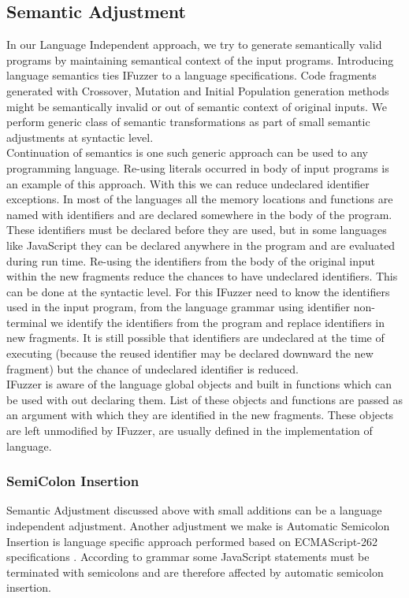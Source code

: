 \documentclass{acm_proc_article-sp}
\begin{document}
\subsection{Semantic Adjustment} \label{semantics}
In our Language Independent approach, we try to generate semantically valid programs by maintaining semantical context of the input programs. Introducing language semantics ties IFuzzer to a language specifications. Code fragments generated with Crossover, Mutation and Initial Population generation   methods might be semantically invalid or out of semantic context of original inputs. We perform generic class of semantic transformations as part of small semantic adjustments at syntactic level. \\
\indent Continuation of semantics is one such generic approach can be used to any programming language. Re-using literals occurred in body of input programs is an example of this approach. With this we can reduce undeclared identifier exceptions. In most of the languages all the memory locations and functions are named with identifiers and are declared somewhere in the body of the program. These identifiers must be declared before they are used, but in some languages like JavaScript they can be declared anywhere in the program and are evaluated during run time. Re-using the identifiers from the body of the original input within the new fragments reduce the chances to have undeclared identifiers. This can be done at the syntactic level. For this IFuzzer need to know the identifiers used in the input program, from the language grammar using identifier non-terminal we identify the identifiers from the program and replace identifiers in new fragments. It is still possible that identifiers are undeclared at the time of executing (because the reused identifier may be declared downward the new fragment) but the chance of undeclared identifier is reduced. \\
\indent IFuzzer is aware of the language global objects and built in functions which can be used with out declaring them. List of these objects and functions are passed as an argument with which they are identified in the new fragments. These objects are left unmodified by IFuzzer, are usually defined in the implementation of language.

\subsubsection*{\textbf{SemiColon Insertion}}
Semantic Adjustment discussed above with small additions can be a language independent adjustment. Another adjustment we make is Automatic Semicolon Insertion is language specific approach performed based on ECMAScript-262 specifications \cite{EcmaScript}. According to grammar some JavaScript statements must be terminated with semicolons and are therefore affected by automatic semicolon insertion. 
\end{document}
